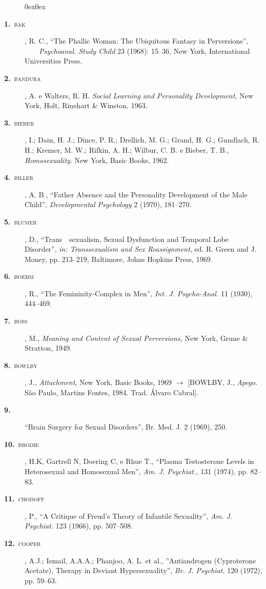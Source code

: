 \begin{description}0ex\parsep0ex\normalsize
\renewcommand{\tit}[2]{\item[\textbf{#1}~\textnormal{\textsc{\MakeTextLowercase{#2}}}]}
\renewcommand{\titidem}[1]{\item[\textbf{#1}~\line(1,0){25}]}

\tit{1.}{Bak}, R. C., ``The Phallic Woman: The Ubiquitous Fantasy in
Perversions'', \ \ \ \ \textit{Psychoanal. Study Child} 23 (1968):
15--36, New York, International Universities Press.

\tit{2.}{Bandura}, A. e Walters, R. H. \textit{Social Learning and Personality
Development, }New York, Holt, Rinehart \& Winston, 1963.

\tit{3.}{Bieber}, I.; Dain, H. J.; Dince, P. R.; Drellich, M. G.; Grand, H. G.; Gundlach,
R. H.; Kremer, M. W.; Rifkin, A. H.; Wilbur, C. B. e Bieber, T. B.,
\textit{Homosexuality}. New York, Basic Books, 1962.

\tit{4.}{Biller}, A. B., ``Father Absence and the Personality Development of
the Male Child'', \textit{Developmental Psychology }2 (1970),
181--270.

\tit{5.}{Blumer}, D., ``Trans\ \ sexualism, Sexual Dysfunction and Temporal
Lobe Disorder'', \textit{in: Transsexualism and Sex Reassignment},
ed. R. Green and J. Money, pp. 213--219, Baltimore, Johns Hopkins Press, 1969.

\tit{6.}{Boehm}, R., ``The Femininity-Complex in Men'',
\textit{Int. J. Psycho-Anal. }11 (1930), 444--469.

\tit{7.}{Boss}, M., \textit{Meaning and Content of Sexual Perversions, }New York, Grune \&
Stratton, 1949.

\tit{8.}{Bowlby}, J., \textit{Attachment}, New York, Basic Books, 1969 {$\bm{\rightarrow}$} [BOWLBY, J.,
\textit{Apego}. São Paulo, Martins Fontes, 1984. Trad. Álvaro Cabral].

\tit{9.}{} ``Brain Surgery for Sexual Disorders'', Br. Med. J. 2
(1969), 250.

\tit{10.}{Brodie}, H.K, Gartrell N, Doering C, e Rhue T., ``Plasma
Testosterone Levels in Heterosexual and Homosexual Men'', \textit{Am.
J. Psychiat., }131 (1974),\textit{ }pp. 82--83.

\tit{11.}{Chodoff}, P., ``A Critique of Freud's Theory of
Infantile Sexuality'', \textit{Am. J. Psychiat. }123 (1966), pp.
507--508.

\tit{12.}{Cooper}, A.J.; Ismail, A.A.A.; Phanjoo, A. L. et al.,
''Antiandrogen (Cyproterone Acetate), Therapy in Deviant
Hypersexuality'', \textit{Br. J. Psychiat. }120 (1972), pp. 59--63.


\end{description}
